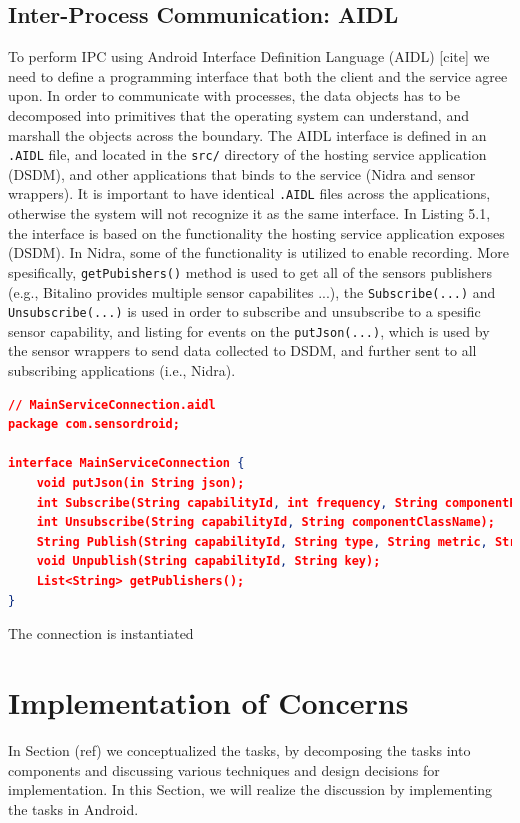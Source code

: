 \subsection{Inter-Process Communication: AIDL}
To perform IPC using Android Interface Definition Language (AIDL) [cite] we need to define a programming interface that both the client and the service agree upon. In order to communicate with processes, the data objects has to be decomposed into primitives that the operating system can understand, and marshall the objects across the boundary. The AIDL interface is defined in an \verb|.AIDL| file, and located in the \verb|src/| directory of the hosting service application (DSDM), and other applications that binds to the service (Nidra and sensor wrappers). It is important to have identical \verb|.AIDL| files across the applications, otherwise the system will not recognize it as the same interface. In Listing 5.1, the interface is based on the functionality the hosting service application exposes (DSDM). In Nidra, some of the functionality is utilized to enable recording. More spesifically, \verb|getPubishers()| method is used to get all of the sensors publishers (e.g., Bitalino provides multiple sensor capabilites ...), the \verb|Subscribe(...)| and \verb|Unsubscribe(...)| is used in order to subscribe and unsubscribe to a spesific sensor capability, and listing for events on the \verb|putJson(...)|, which is used by the sensor wrappers to send data collected to DSDM, and further sent to all subscribing applications (i.e., Nidra). 


\begin{lstlisting}[language=json, caption={My Caption}, captionpos=b]
// MainServiceConnection.aidl
package com.sensordroid;

interface MainServiceConnection {
    void putJson(in String json);
    int Subscribe(String capabilityId, int frequency, String componentPackageName, String componentClassName);
    int Unsubscribe(String capabilityId, String componentClassName);
    String Publish(String capabilityId, String type, String metric, String description);
    void Unpublish(String capabilityId, String key);
    List<String> getPublishers();
}
\end{lstlisting}

The connection is instantiated 


\section{Implementation of Concerns}
In Section (ref) we conceptualized the tasks, by decomposing the tasks into components and discussing various techniques and design decisions for implementation. In this Section, we will realize the discussion by implementing the tasks in Android. 

